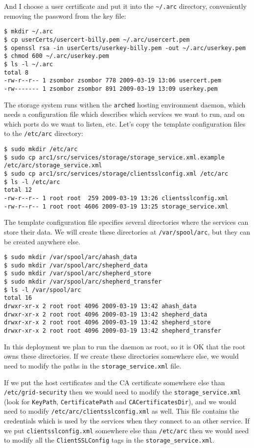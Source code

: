 \documentclass{book}
\begin{document}
And I choose a user certificate and put it into the \verb!~/.arc! directory, conveniently removing the password from the key file:

\begin{verbatim}
$ mkdir ~/.arc
$ cp userCerts/usercert-billy.pem ~/.arc/usercert.pem
$ openssl rsa -in userCerts/userkey-billy.pem -out ~/.arc/userkey.pem
$ chmod 600 ~/.arc/userkey.pem
$ ls -l ~/.arc
total 8
-rw-r--r-- 1 zsombor zsombor 778 2009-03-19 13:06 usercert.pem
-rw------- 1 zsombor zsombor 891 2009-03-19 13:09 userkey.pem
\end{verbatim}

The storage system runs withen the \verb!arched! hosting environment daemon, which needs a configuration file which describes which services we want to run, and on which ports do we want to listen, etc.
Let's copy the template configuration files to the \verb!/etc/arc! directory:

\begin{verbatim}
$ sudo mkdir /etc/arc
$ sudo cp arc1/src/services/storage/storage_service.xml.example /etc/arc/storage_service.xml
$ sudo cp arc1/src/services/storage/clientsslconfig.xml /etc/arc
$ ls -l /etc/arc
total 12
-rw-r--r-- 1 root root  259 2009-03-19 13:26 clientsslconfig.xml
-rw-r--r-- 1 root root 4606 2009-03-19 13:25 storage_service.xml
\end{verbatim}

The template configuration file specifies several directories where the services can store their data. We will create these directories at \verb!/var/spool/arc!, but they can be created anywhere else.

\begin{verbatim}
$ sudo mkdir /var/spool/arc/ahash_data
$ sudo mkdir /var/spool/arc/shepherd_data
$ sudo mkdir /var/spool/arc/shepherd_store
$ sudo mkdir /var/spool/arc/shepherd_transfer
$ ls -l /var/spool/arc
total 16
drwxr-xr-x 2 root root 4096 2009-03-19 13:42 ahash_data
drwxr-xr-x 2 root root 4096 2009-03-19 13:42 shepherd_data
drwxr-xr-x 2 root root 4096 2009-03-19 13:42 shepherd_store
drwxr-xr-x 2 root root 4096 2009-03-19 13:42 shepherd_transfer
\end{verbatim}

In this deployment we plan to run the daemon as root, so it is OK that the root owns these directories. 
If we create these directories somewhere else, we would need to modify the paths in the \verb!storage_service.xml! file.

If we put the host certificates and the CA certificate somewhere else than \verb!/etc/grid-security! then we would need to modify the \verb!storage_service.xml! (look for \verb!KeyPath!, \verb!CertificatePath! and \verb!CACertificatesDir!), and we would need to modify \verb!/etc/arc/clientsslconfig.xml! as well. This file contains the credentials which is used by the services when they connect to an other service. If we put \verb!clientsslconfig.xml! somewhere else than \verb!/etc/arc! then we would need to modify all the \verb!ClientSSLConfig! tags in the \verb!storage_service.xml!.
\end{document}
